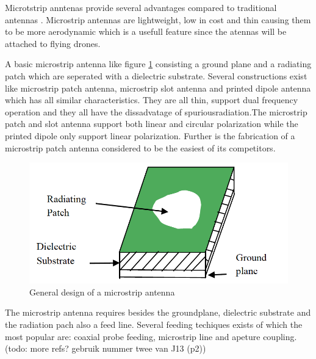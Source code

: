Microtstrip anntenas provide several advantages compared to traditional antennas \cite{J13_singh2011micro, J14_antennadesign}. Microstrip antennas
are lightweight, low in cost and thin causing them to be more aerodynamic which is  a usefull feature since the atennas will be attached
to flying drones.

A basic microstrip antenna like figure \ref{fig:basicpatchantenna} consisting a ground plane and
a radiating patch which are seperated with a dielectric substrate. Several constructions exist like microstrip patch antenna, microstrip slot antenna and printed dipole antenna which
has all similar characteristics. They are all thin, support dual frequency operation and they all have the dissadvatage of \gls{spuriousradiation}.The microstrip patch and slot antenna support both linear
and circular polarization while the printed dipole only support linear polarization. Further is the fabrication of a microstrip patch antenna considered to be the easiest of its competitors. 



\begin{figure}[H]
  \includegraphics[width=\textwidth/2]{../images/patchantenna.png}
  \caption{General design of a microstrip antenna}
  \label{fig:basicpatchantenna}
\end{figure}


The microstrip antenna requires besides the groundplane, dielectric substrate and the radiation pach also a feed line. Several feeding techiques exists of which the most popular are: coaxial probe feeding, microstrip line and apeture coupling. %
(todo: more refs? gebruik nummer twee van J13 (p2))

